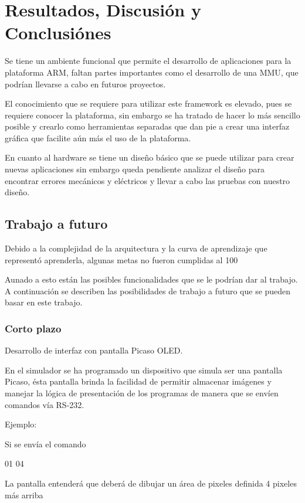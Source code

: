 \chapter{Resultados, Discusi\'on y Conclusi\'ones}\label{ch:resultados}

Se tiene un ambiente funcional que permite el desarrollo de aplicaciones para la plataforma ARM, faltan partes importantes como el desarrollo de una MMU, que podrían llevarse a cabo en futuros proyectos.

El conocimiento que se requiere para utilizar este framework es elevado, pues se requiere conocer la plataforma, sin embargo se ha tratado de hacer lo más sencillo posible y crearlo como herramientas separadas que dan pie a crear una interfaz gráfica que facilite aún más el uso de la plataforma.

En cuanto al hardware se tiene un diseño básico que se puede utilizar para crear nuevas aplicaciones sin embargo queda pendiente analizar el diseño para encontrar errores mecánicos y eléctricos y llevar a cabo las pruebas con nuestro diseño.

\section{Trabajo a futuro}

Debido a la complejidad de la arquitectura y la curva de aprendizaje que representó aprenderla, algunas metas no fueron cumplidas al 100%

Aunado a esto están las posibles funcionalidades que se le podrían dar al trabajo. A continuación se describen las posibilidades de trabajo a futuro que se pueden basar en este trabajo.

\subsection{Corto plazo}

Desarrollo de interfaz con pantalla Picaso OLED.

En el simulador se ha programado un dispositivo que simula ser una pantalla Picaso, ésta pantalla brinda la facilidad de permitir almacenar imágenes y manejar la lógica de presentación de los programas de manera que se envíen comandos vía RS-232.

Ejemplo:

Si se envía el comando

01 04

La pantalla entenderá que deberá de dibujar un área de pixeles definida 4 pixeles más arriba

